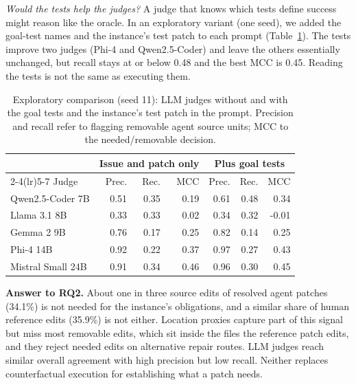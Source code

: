\documentclass[a4paper,fleqn]{cas-sc}
\newcommand{\rqtwoAgentSrcUnneeded}{34.1\%}
\newcommand{\rqtwoGoldSrcUnneeded}{35.9\%}
\newcommand{\rqtwoInfMaxMcc}{0.45}
\newcommand{\rqtwoInfMaxRecall}{0.48}
\begin{document}
\emph{Would the tests help the judges?} A judge that knows which tests define success might reason like the oracle. In an exploratory variant (one seed), we added the goal-test names and the instance's test patch to each prompt (Table~\ref{tab:informed}). The tests improve two judges (Phi-4 and Qwen2.5-Coder) and leave the others essentially unchanged, but recall stays at or below \rqtwoInfMaxRecall{} and the best MCC is \rqtwoInfMaxMcc{}. Reading the tests is not the same as executing them.

\begin{table}[pos=htbp]
\caption{Exploratory comparison (seed 11): LLM judges without and with the goal tests and the instance's test patch in the prompt. Precision and recall refer to flagging removable agent source units; MCC to the needed/removable decision.}
\label{tab:informed}
\centering\footnotesize
\begin{tabular}{lrrrrrr}
\toprule
 & \multicolumn{3}{c}{Issue and patch only} & \multicolumn{3}{c}{Plus goal tests} \\
\cmidrule(lr){2-4}\cmidrule(lr){5-7}
Judge & Prec. & Rec. & MCC & Prec. & Rec. & MCC \\
\midrule
Qwen2.5-Coder 7B & 0.51 & 0.35 & 0.19 & 0.61 & 0.48 & 0.34 \\
Llama 3.1 8B & 0.33 & 0.33 & 0.02 & 0.34 & 0.32 & -0.01 \\
Gemma 2 9B & 0.76 & 0.17 & 0.25 & 0.82 & 0.14 & 0.25 \\
Phi-4 14B & 0.92 & 0.22 & 0.37 & 0.97 & 0.27 & 0.43 \\
Mistral Small 24B & 0.91 & 0.34 & 0.46 & 0.96 & 0.30 & 0.45 \\
\bottomrule
\end{tabular}
\end{table}

\begin{answerbox}\textbf{Answer to RQ2.} About one in three source edits of resolved agent patches (\rqtwoAgentSrcUnneeded{}) is not needed for the instance's obligations, and a similar share of human reference edits (\rqtwoGoldSrcUnneeded{}) is not either. Location proxies capture part of this signal but miss most removable edits, which sit inside the files the reference patch edits, and they reject needed edits on alternative repair routes. LLM judges reach similar overall agreement with high precision but low recall. Neither replaces counterfactual execution for establishing what a patch needs.\end{answerbox}
\end{document}
